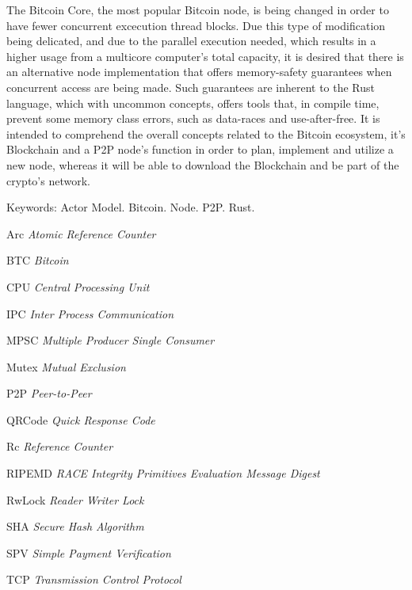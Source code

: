 \begin{resumo}[Abstract]
The Bitcoin Core, the most popular Bitcoin node, is being changed in order to have fewer concurrent excecution thread blocks. Due this type of modification being delicated, and due to the parallel execution needed, which results in a higher usage from a multicore computer's total capacity, it is desired that there is an alternative node implementation that offers memory-safety guarantees when concurrent access are being made.
Such guarantees are inherent to the Rust language, which with uncommon concepts, offers tools that, in compile time, prevent some memory class errors, such as data-races and use-after-free.
It is intended to comprehend the overall concepts related to the Bitcoin ecosystem, it's Blockchain and a P2P node's function in order to plan, implement and utilize a new node, whereas it will be able to download the Blockchain and be part of the crypto's network.

Keywords: Actor Model. Bitcoin. Node. P2P. Rust.

\end{resumo}


\listoffigures*
\cleardoublepage


\begin{siglas}
    \item[Arc] \textit{Atomic Reference Counter}
    \item[BTC] \textit{Bitcoin}
    \item[CPU] \textit{Central Processing Unit}
    \item[IPC] \textit{Inter Process Communication}
    \item[MPSC] \textit{Multiple Producer Single Consumer}
    \item[Mutex] \textit{Mutual Exclusion}
    \item[P2P] \textit{Peer-to-Peer}
    \item[QRCode] \textit{Quick Response Code}
    \item[Rc] \textit{Reference Counter}
    \item[RIPEMD] \textit{RACE Integrity Primitives Evaluation Message Digest}
    \item[RwLock] \textit{Reader Writer Lock}
    \item[SHA] \textit{Secure Hash Algorithm}
    \item[SPV] \textit{Simple Payment Verification}
    \item[TCP] \textit{Transmission Control Protocol}
\end{siglas}

